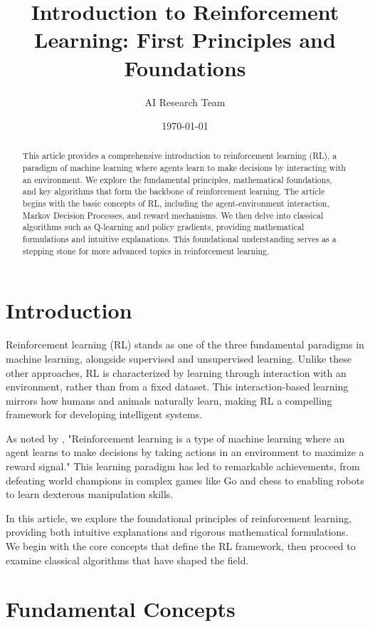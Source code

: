 \documentclass{article}
\title{Introduction to Reinforcement Learning: First Principles and Foundations}
\author{AI Research Team}
\date{\today}
\begin{document}
\maketitle

\begin{abstract}
This article provides a comprehensive introduction to reinforcement learning (RL), a paradigm of machine learning where agents learn to make decisions by interacting with an environment. We explore the fundamental principles, mathematical foundations, and key algorithms that form the backbone of reinforcement learning. The article begins with the basic concepts of RL, including the agent-environment interaction, Markov Decision Processes, and reward mechanisms. We then delve into classical algorithms such as Q-learning and policy gradients, providing mathematical formulations and intuitive explanations. This foundational understanding serves as a stepping stone for more advanced topics in reinforcement learning.
\end{abstract}

\section{Introduction}

Reinforcement learning (RL) stands as one of the three fundamental paradigms in machine learning, alongside supervised and unsupervised learning. Unlike these other approaches, RL is characterized by learning through interaction with an environment, rather than from a fixed dataset. This interaction-based learning mirrors how humans and animals naturally learn, making RL a compelling framework for developing intelligent systems.

As noted by \cite{theiotacademy2023}, "Reinforcement learning is a type of machine learning where an agent learns to make decisions by taking actions in an environment to maximize a reward signal." This learning paradigm has led to remarkable achievements, from defeating world champions in complex games like Go and chess to enabling robots to learn dexterous manipulation skills.

In this article, we explore the foundational principles of reinforcement learning, providing both intuitive explanations and rigorous mathematical formulations. We begin with the core concepts that define the RL framework, then proceed to examine classical algorithms that have shaped the field.

\section{Fundamental Concepts}
\end{document}
